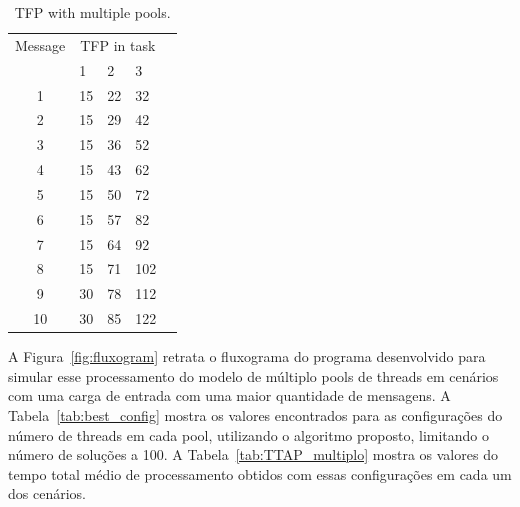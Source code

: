 \begin{table}[htb]
\centering
\caption{TFP with multiple pools.}
\label{tab:TFP}
\begin{tabular}{cllll}
\hline
\multicolumn{1}{c}{Message} & \multicolumn{3}{c}{TFP in task} \\
							  & 1      & 2       & 3            \\ \hline
1                             & 15      & 22      & 32               \\
2                             & 15      & 29      & 42               \\
3                             & 15      & 36      & 52               \\
4                             & 15      & 43      & 62              \\
5                             & 15      & 50      & 72               \\
6                             & 15      & 57      & 82               \\
7                             & 15      & 64      & 92               \\
8                             & 15      & 71      & 102            \\
9                             & 30      & 78      & 112             \\
10                            & 30      & 85      & 122      \\ \hline
\end{tabular}
\end{table} 
A Figura~\ref{fig:fluxogram} retrata o fluxograma do programa desenvolvido para simular esse processamento do modelo de múltiplo pools de threads em cenários com uma carga de entrada com uma maior quantidade de mensagens. A Tabela~\ref{tab:best_config} mostra os valores encontrados para as configurações do número de threads em cada pool, utilizando o algoritmo proposto, limitando o número de soluções a 100. A Tabela~\ref{tab:TTAP_multiplo} mostra os valores do tempo total médio de processamento obtidos com essas configurações em cada um dos cenários.
